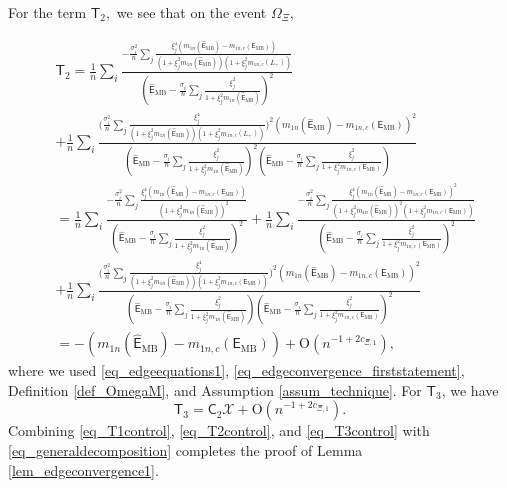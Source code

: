 \documentclass[12pt]{article}
\theoremstyle{plain}
\numberwithin{equation}{section}
\begin{document}
For the term $\mathsf{T}_2,$ we see that on the event $\Omega_{\Xi}$,

\begin{align}\label{eq_T2control}
	&\mathsf{T}_2=\frac{1}{n}\sum_i\frac{-\frac{\sigma_i^2}{n}\sum_j\frac{\xi^4_j(m_{1n}(\widehat{\mathsf{E}}_{\mathrm{MB}})-m_{1n,c}(\mathsf{E}_{\mathrm{MB}}))}{(1+\xi^2_jm_{1n}(\widehat{\mathsf{E}}_{\mathrm{MB}}))(1+\xi^2_jm_{1n,c}(L_{+}))}}{(\widehat{\mathsf{E}}_{\mathrm{MB}}-\frac{\sigma_i}{n}\sum_j\frac{\xi^2_j}{1+\xi^2_jm_{1n}(\widehat{\mathsf{E}}_{\mathrm{MB}})})^2} \nonumber \\
	&+\frac{1}{n}\sum_i\frac{\big(\frac{\sigma_i^2}{n}\sum_j\frac{\xi^4_j}{(1+\xi^2_jm_{1n}(\widehat{\mathsf{E}}_{\mathrm{MB}}))(1+\xi^2_jm_{1n,c}(L_{+}))}\big)^2(m_{1n}(\widehat{\mathsf{E}}_{\mathrm{MB}})-m_{1n,c}(\mathsf{E}_{\mathrm{MB}}))^2}{(\widehat{\mathsf{E}}_{\mathrm{MB}}-\frac{\sigma_i}{n}\sum_j\frac{\xi^2_j}{1+\xi^2_jm_{1n}(\widehat{\mathsf{E}}_{\mathrm{MB}})})^2(\widehat{\mathsf{E}}_{\mathrm{MB}}-\frac{\sigma_i}{n}\sum_j\frac{\xi^2_j}{1+\xi^2_jm_{1n,c}(\mathsf{E}_{\mathrm{MB}})})} \nonumber \\
	&=\frac{1}{n}\sum_i\frac{-\frac{\sigma_i^2}{n}\sum_j\frac{\xi^4_j(m_{1n}(\widehat{\mathsf{E}}_{\mathrm{MB}})-m_{1n,c}(\mathsf{E}_{\mathrm{MB}}))}{(1+\xi^2_jm_{1n}(\widehat{\mathsf{E}}_{\mathrm{MB}}))^2}}{(\widehat{\mathsf{E}}_{\mathrm{MB}}-\frac{\sigma_i}{n}\sum_j\frac{\xi^2_j}{1+\xi^2_jm_{1n}(\widehat{\mathsf{E}}_{\mathrm{MB}})})^2}+\frac{1}{n}\sum_i\frac{-\frac{\sigma_i^2}{n}\sum_j\frac{\xi^4_j(m_{1n}(\widehat{\mathsf{E}}_{\mathrm{MB}})-m_{1n,c}(\mathsf{E}_{\mathrm{MB}}))^2}{(1+\xi^2_jm_{1n}(\widehat{\mathsf{E}}_{\mathrm{MB}}))^2(1+\xi^2_jm_{1n,c}(\mathsf{E}_{\mathrm{MB}}))}}{(\widehat{\mathsf{E}}_{\mathrm{MB}}-\frac{\sigma_i}{n}\sum_j\frac{\xi^2_j}{1+\xi^2_jm_{1n,c}(\mathsf{E}_{\mathrm{MB}})})^2} \nonumber \\
	&+\frac{1}{n}\sum_i\frac{\big(\frac{\sigma_i^2}{n}\sum_j\frac{\xi^4_j}{(1+\xi^2_jm_{1n}(\widehat{\mathsf{E}}_{\mathrm{MB}}))(1+\xi^2_jm_{1n,c}(\mathsf{E}_{\mathrm{MB}}))}\big)^2(m_{1n}(\widehat{\mathsf{E}}_{\mathrm{MB}})-m_{1n,c}(\mathsf{E}_{\mathrm{MB}}))^2}{(\widehat{\mathsf{E}}_{\mathrm{MB}}-\frac{\sigma_i}{n}\sum_j\frac{\xi^2_j}{1+\xi^2_jm_{1n}(\widehat{\mathsf{E}}_{\mathrm{MB}})})(\widehat{\mathsf{E}}_{\mathrm{MB}}-\frac{\sigma_i}{n}\sum_j\frac{\xi^2_j}{1+\xi^2_jm_{1n,c}(\mathsf{E}_{\mathrm{MB}})})^2}  \\
	&=-(m_{1n}(\widehat{\mathsf{E}}_{\mathrm{MB}})-m_{1n,c}(\mathsf{E}_{\mathrm{MB}}))+\mathrm{O}(n^{-1+2c_{\Xi,1}}), \nonumber
\end{align}
where we used \eqref{eq_edgeequations1}, \eqref{eq_edgeconvergence_firststatement}, Definition \ref{def_OmegaM}, and Assumption \ref{assum_technique}. For $\mathsf{T}_3$, we have
\begin{equation}\label{eq_T3control}
	\mathsf{T}_3=\mathsf{C}_2 \mathcal{X}+\mathrm{O}(n^{-1+2c_{\Xi,1}}). 
\end{equation}
Combining \eqref{eq_T1control}, \eqref{eq_T2control}, and \eqref{eq_T3control} with \eqref{eq_generaldecomposition} completes the proof of Lemma \ref{lem_edgeconvergence1}.
\end{document}
